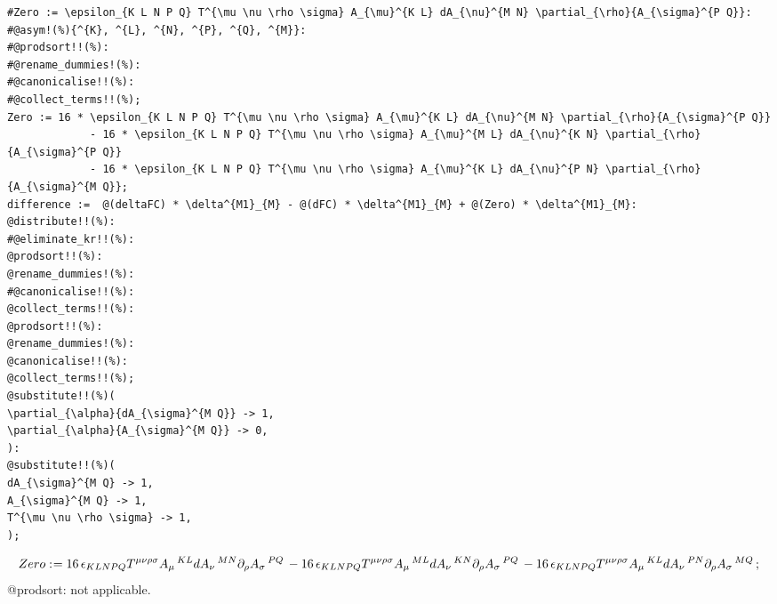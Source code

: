 \documentclass[11pt]{article}
\def\specialcolon{\mathrel{\mathop{:}}\hspace{-.5em}}
\begin{document}
{\color[named]{Blue}\begin{verbatim}
#Zero := \epsilon_{K L N P Q} T^{\mu \nu \rho \sigma} A_{\mu}^{K L} dA_{\nu}^{M N} \partial_{\rho}{A_{\sigma}^{P Q}}:
#@asym!(%){^{K}, ^{L}, ^{N}, ^{P}, ^{Q}, ^{M}}:
#@prodsort!!(%):
#@rename_dummies!(%):
#@canonicalise!!(%):
#@collect_terms!!(%);
Zero := 16 * \epsilon_{K L N P Q} T^{\mu \nu \rho \sigma} A_{\mu}^{K L} dA_{\nu}^{M N} \partial_{\rho}{A_{\sigma}^{P Q}}
             - 16 * \epsilon_{K L N P Q} T^{\mu \nu \rho \sigma} A_{\mu}^{M L} dA_{\nu}^{K N} \partial_{\rho}{A_{\sigma}^{P Q}}
             - 16 * \epsilon_{K L N P Q} T^{\mu \nu \rho \sigma} A_{\mu}^{K L} dA_{\nu}^{P N} \partial_{\rho}{A_{\sigma}^{M Q}};
difference :=  @(deltaFC) * \delta^{M1}_{M} - @(dFC) * \delta^{M1}_{M} + @(Zero) * \delta^{M1}_{M}:
@distribute!!(%):
#@eliminate_kr!!(%):
@prodsort!!(%):
@rename_dummies!(%):
#@canonicalise!!(%):
@collect_terms!!(%):
@prodsort!!(%):
@rename_dummies!(%):
@canonicalise!!(%):
@collect_terms!!(%);
@substitute!!(%)(
\partial_{\alpha}{dA_{\sigma}^{M Q}} -> 1,
\partial_{\alpha}{A_{\sigma}^{M Q}} -> 0,
):
@substitute!!(%)(
dA_{\sigma}^{M Q} -> 1,
A_{\sigma}^{M Q} -> 1,
T^{\mu \nu \rho \sigma} -> 1,
);
\end{verbatim}}
\begin{dmath*}[compact, spread=2pt]
Zero\specialcolon{}= 16\, {\epsilon}_{K L N P Q} {T}^{\mu \nu \rho \sigma} {A}_{\mu}\,^{K L} {dA}_{\nu}\,^{M N} {\partial}_{\rho}{{A}_{\sigma}\,^{P Q}}\,  - 16\, {\epsilon}_{K L N P Q} {T}^{\mu \nu \rho \sigma} {A}_{\mu}\,^{M L} {dA}_{\nu}\,^{K N} {\partial}_{\rho}{{A}_{\sigma}\,^{P Q}}\,  - 16\, {\epsilon}_{K L N P Q} {T}^{\mu \nu \rho \sigma} {A}_{\mu}\,^{K L} {dA}_{\nu}\,^{P N} {\partial}_{\rho}{{A}_{\sigma}\,^{M Q}}\, ;
\end{dmath*}
@prodsort: not applicable.
\end{document}
